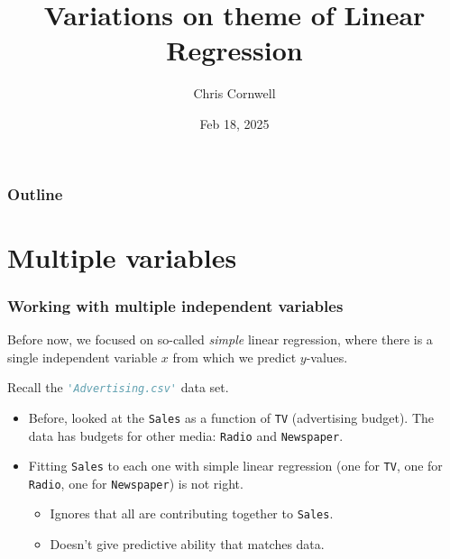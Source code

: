 \documentclass{beamer}
\author{Chris Cornwell}
\date{Feb 18, 2025}
\title{Variations on theme of Linear Regression}
\theoremstyle{example}
\newcommand{\ttt}[1]{{\small\texttt{#1}}}
\begin{document}
\begin{frame}
\titlepage
\end{frame}

\begin{frame}
\frametitle{Outline}
\tableofcontents
\end{frame}

\section{Multiple variables}

\begin{frame}
\frametitle{Working with multiple independent variables}
Before now, we focused on so-called \emph{simple} linear regression, where there is a single independent variable $x$ from which we predict $y$-values.

Recall the \lstinline[language=Python, stringstyle=\ttfamily\color{strings}]{'Advertising.csv'} data set.

\begin{itemize}
    \item Before, looked at the \ttt{Sales} as a function of \ttt{TV} (advertising budget). The data has budgets for other media: \ttt{Radio} and \ttt{Newspaper}.
    \pause
    \item Fitting \ttt{Sales} to each one with simple linear regression (one for \ttt{TV}, one for \ttt{Radio}, one for \ttt{Newspaper}) is not right. 
    \begin{itemize}
        \item Ignores that all are contributing together to \ttt{Sales}.
        \item Doesn't give predictive ability that matches data.
    \end{itemize}
\end{itemize}

\end{frame}
\end{document}
